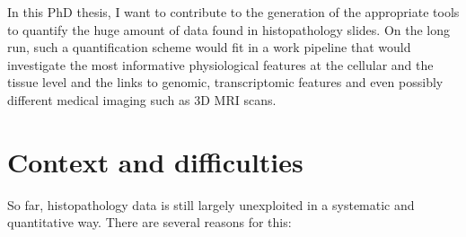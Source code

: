\documentclass[a4paper,10pt,twocolumn]{article}
\begin{document}
In this PhD thesis, I want to contribute to the generation of the
appropriate tools to quantify the huge amount of data found in
histopathology slides. On the long run, such a
 quantification scheme would fit in a work pipeline that would
 investigate the most informative physiological features at the
 cellular and the tissue level and the links
 to genomic, transcriptomic features and even possibly different
 medical imaging such as 3D MRI scans. 

\section{Context and difficulties}

So far, histopathology data is still largely unexploited in a systematic and
quantitative way. There are several reasons for this: 
\end{document}
